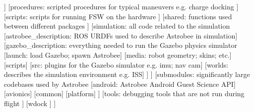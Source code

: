 \documentclass{article}
\begin{document}
\begin{adjustwidth}{-1in}{-1in}
\begin{forest}
	]
	[procedures: scripted procedures for typical maneuvers e.g. charge docking
	]
	[scripts: scripts for running FSW on the hardware
	]
	[shared: functions used between different packages
	]
	[simulation: all code related to the simulation
	[astrobee\_description: ROS URDFs used to describe Astrobee in simulation]
	[gazebo\_description: everything needed to run the Gazebo physics simulator
	[launch: load Gazebo; spawn Astrobee]
	[media: robot geometry; skins; etc.]
	[scripts]
	[src: plugins for the Gazebo simulator e.g. imu; nav cam]
	[worlds: describes the simulation environment e.g. ISS]
	]
	]
	[submodules: significantly large codebases used by Astrobee
	[android: Astrobee Android Guest Science API]
	[avionics]
	[common]
	[platform]
	]
	[tools: debugging tools that are not run during flight
	]
	[wdock
	]
	]
\end{forest}
\end{adjustwidth}
\end{document}
